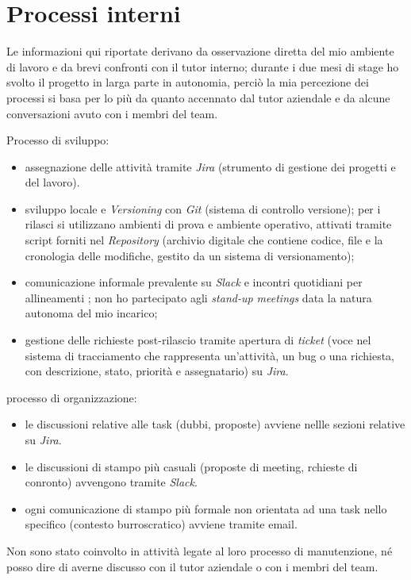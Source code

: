 \section{Processi interni}

Le informazioni qui riportate derivano da osservazione diretta del mio ambiente di lavoro e da brevi confronti con il tutor interno; 
durante i due mesi di stage ho svolto il progetto in larga parte in autonomia, perciò la mia percezione dei processi si basa per lo più da quanto accennato dal tutor aziendale
e da alcune conversazioni avuto con i membri del team.

Processo di sviluppo:
\begin{itemize}
\item assegnazione delle attività tramite \emph{Jira} (strumento di gestione dei progetti e del lavoro).
\item sviluppo locale e \emph{Versioning} con \emph{Git} (sistema di controllo versione); per i rilasci si utilizzano ambienti di prova e ambiente operativo, attivati tramite script forniti nel \emph{Repository} (archivio digitale che contiene codice, file e la cronologia delle modifiche, gestito da un sistema di versionamento);
\item comunicazione informale prevalente su \emph{Slack} e incontri quotidiani per allineamenti ; non ho partecipato agli \emph{stand-up meetings} data la natura autonoma del mio incarico;
\item gestione delle richieste post-rilascio tramite apertura di \emph{ticket} (voce nel sistema di tracciamento che rappresenta un'attività, un bug o una richiesta, con descrizione, stato, priorità e assegnatario) su \emph{Jira}.
\end{itemize}

processo di organizzazione:
\begin{itemize}
    \item le discussioni relative alle task (dubbi, proposte) avviene nellle sezioni relative su \emph{Jira}.
    \item le discussioni di stampo più casuali (proposte di meeting, rchieste di conronto) avvengono tramite \emph{Slack}.
    \item ogni comunicazione di stampo più formale non orientata ad una task nello specifico (contesto burroscratico) avviene tramite email.
\end{itemize}

Non sono stato coinvolto in attività legate al loro processo di manutenzione, né posso dire di averne discusso con il tutor aziendale o con i membri del team.